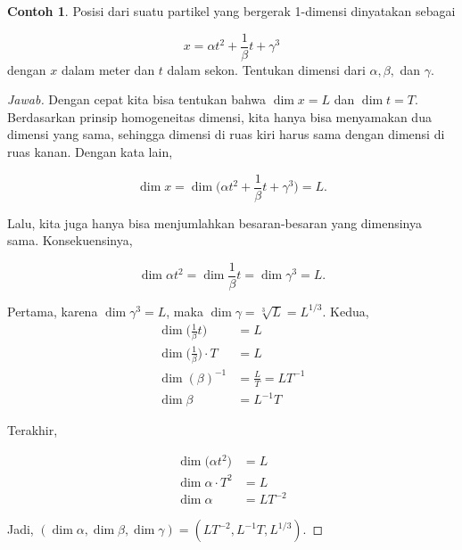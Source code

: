 \documentclass[12pt, a4paper]{article}\usepackage[utf8]{inputenc}
\theoremstyle{plain}
\theoremstyle{plain}
\numberwithin{equation}{section}
\theoremstyle{definition}
\newtheorem{contoh}[teorema]{Contoh}
\begin{document}
	\begin{contoh}
		Posisi dari suatu partikel yang bergerak 1-dimensi dinyatakan sebagai
		
		\begin{equation*}
			x = \alpha t^2 + \frac{1}{\beta} t + \gamma^3
		\end{equation*}
		dengan $x$ dalam meter dan $t$ dalam sekon. Tentukan dimensi dari $\alpha, \beta,$ dan $\gamma$.
	\end{contoh}
	\begin{proof}[Jawab]
		Dengan cepat kita bisa tentukan bahwa $\dim x = L$ dan $\dim t = T$. Berdasarkan prinsip homogeneitas dimensi, kita hanya bisa menyamakan dua dimensi yang sama, sehingga dimensi di ruas kiri harus sama dengan dimensi di ruas kanan. Dengan kata lain,
		
		\begin{equation*}
			\dim x = \dim \Big(\alpha t^2 + \frac{1}{\beta} t + \gamma^3\Big) = L.
		\end{equation*}
		
		Lalu, kita juga hanya bisa menjumlahkan besaran-besaran yang dimensinya sama. Konsekuensinya,
		
		\begin{equation*}
			\dim \alpha t^2 = \dim \frac{1}{\beta} t = \dim \gamma^3 = L.
		\end{equation*}
		
		Pertama, karena $\dim \gamma^3 = L$, maka $\dim \gamma = \sqrt[3]{L} = L^{1/3}.$ Kedua, 
		\begin{align*}
			\dim \Big(\frac{1}{\beta} t \Big) &= L\\[.2em]
			\dim \Big(\frac{1}{\beta}\Big) \cdot T &= L\\[.4em]
			\dim (\beta)^{-1} &= \frac{L}{T} = LT^{-1}\\[.8em]
			\dim \beta &= L^{-1}T
		\end{align*}
		
		Terakhir,
		
		\vspace{-.5em}
		\begin{align*}
			\dim \Big(\alpha t^2\Big) &= L\\[.5em]
			\dim \alpha \cdot T^2 &= L\\[.5em]
			\dim \alpha &= LT^{-2}
		\end{align*}
		
		Jadi, $(\dim \alpha, \dim \beta, \dim \gamma) = (LT^{-2}, L^{-1}T, L^{1/3}).$
	\end{proof}
	
\end{document}
